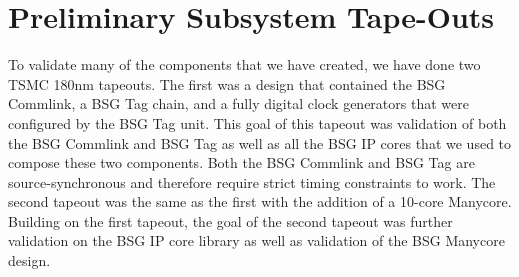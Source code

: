 
\section{Preliminary Subsystem Tape-Outs}

To validate many of the components that we have created, we have done two
TSMC 180nm tapeouts. The first was a design that contained the BSG
Commlink, a BSG Tag chain, and a fully digital clock generators that were
configured by the BSG Tag unit. This goal of this tapeout was validation
of both the BSG Commlink and BSG Tag as well as all the BSG IP cores that
we used to compose these two components. Both the BSG Commlink and BSG
Tag are source-synchronous and therefore require strict timing
constraints to work. The second tapeout was the same as the first with
the addition of a 10-core Manycore. Building on the first tapeout, the
goal of the second tapeout was further validation on the BSG IP core
library as well as validation of the BSG Manycore design.

